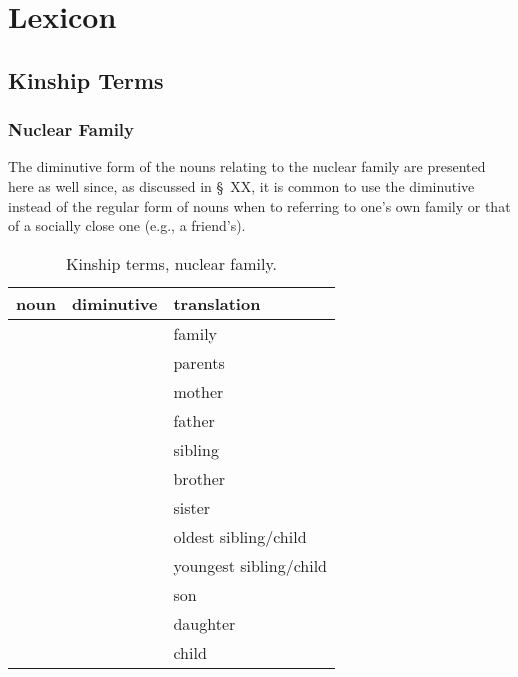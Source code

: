 \chapter{Lexicon}

\section{Kinship Terms}\label{sec:kinship terms}
\subsection{Nuclear Family}\label{sec:nuclear family}

The diminutive form of the nouns relating to the nuclear family are presented here as well since, as discussed in \S~XX, it is common to use the diminutive instead of the regular form of nouns when to referring to one's own family or that of a socially close one (e.g., a friend's).


\begin{table}[h!]
  \caption{Kinship terms, nuclear family.}
  \label{tbl:kinship}
  \footnotesize\sffamily
  \begin{tabu} to 0.8\textwidth{YYY[1.5]}
  \toprule
  {\sc noun}    & {\sc diminutive} & {\sc translation}\\
  \midrule
      &  & family\\
      &        & parents\\
      &      & mother\\
    &      & father\\
      &      & sibling\\
      &      & brother\\
      &      & sister\\
      &      & oldest sibling/child\\
      &      & youngest sibling/child\\
      &      & son\\
      &      & daughter\\
      &      & child\\

  \bottomrule

  \end{tabu}
\end{table}
